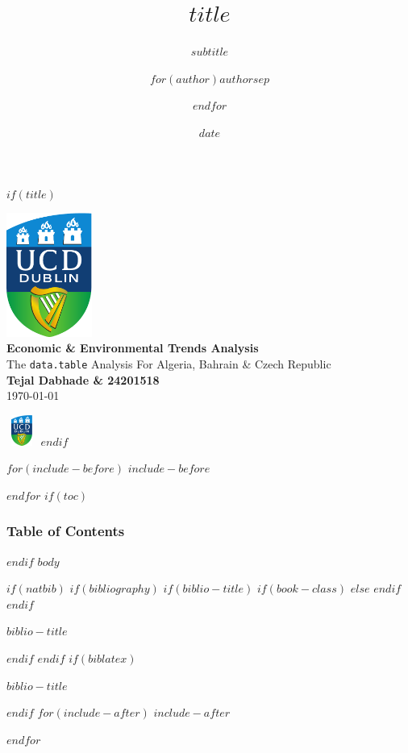 \documentclass[$if(fontsize)$$fontsize$,$endif$$if(lang)$$babel-lang$,$endif$$if(handout)$handout,$endif$$if(beamer)$ignorenonframetext,$endif$$for(classoption)$$classoption$$sep$,$endfor$]{$documentclass$}
\title{$title$}
\subtitle{$subtitle$}
\author{$for(author)$$author$$sep$ \and $endfor$}
\date{$date$}
\newif\ifbibliography
\begin{document}
	$if(title)$
	\begin{frame}[plain]
  \color{white}

  \vspace*{1.2cm} %

  \begin{center}
    \includegraphics[width=2.8cm]{UCDlogo.pdf} \\[0.8cm] %

    {\Huge \textbf{Economic \& Environmental Trends Analysis}}\\[0.3cm]
    {\large The \texttt{data.table} Analysis For Algeria, Bahrain \& Czech Republic}\\[1.0cm]

    {\Large \textbf{Tejal Dabhade \& 24201518}}\\[0.4cm]
    {\normalsize \today}
  \end{center}
\end{frame}
		\includegraphics[width=1cm,height=1cm,keepaspectratio]{UCDlogo.pdf}
	$endif$
	
	$for(include-before)$
	$include-before$
	
	$endfor$
	$if(toc)$
	\begin{frame}
		\frametitle{Table of Contents}
		\tableofcontents[hideallsubsections]
	\end{frame}
	
	$endif$
	$body$
	
	$if(natbib)$
	$if(bibliography)$
	$if(biblio-title)$
	$if(book-class)$
	\renewcommand\bibname{$biblio-title$}
	$else$
	\renewcommand\refname{$biblio-title$}
	$endif$
	$endif$
	\begin{frame}[allowframebreaks]{$biblio-title$}
		\bibliographytrue
		
	\end{frame}
	
	$endif$
	$endif$
	$if(biblatex)$
	\begin{frame}[allowframebreaks]{$biblio-title$}
		\bibliographytrue
		\printbibliography[heading=none]
	\end{frame}
	
	$endif$
	$for(include-after)$
	$include-after$
	
	$endfor$
\end{document}
